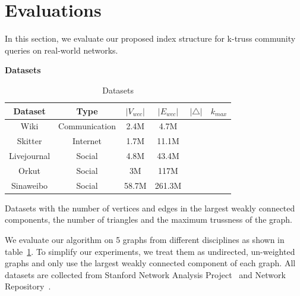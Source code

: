 \section{Evaluations}
\label{evaluation}

In this section, we evaluate our proposed index structure for k-truss community queries on real-world networks.

\vskip 0.1in \noindent \textbf{Datasets} 

\begin{table}
		\caption{Datasets}
		\vspace{2 mm}
		\label{table:datasets}
		\begin{threeparttable}
			\centering
			\begin{tabular}{c|ccccc} \hline
				Dataset & Type & $|V_{wcc}|$ & $|E_{wcc}|$ & $|\triangle|$ & $k_{max}$ \\ \hline
				Wiki & Communication & 2.4M & 4.7M &  & \\ 
				Skitter & Internet & 1.7M & 11.1M & & \\ 
				Livejournal & Social & 4.8M & 43.4M & & \\ 
				Orkut & Social & 3M & 117M & & \\ 
				Sinaweibo & Social & 58.7M & 261.3M & & \\ \hline
			\end{tabular}
			\begin{tablenotes}
				\item Datasets with the number of vertices and edges in the largest weakly connected components, the number of triangles and the maximum trussness of the graph.
			\end{tablenotes}
		\end{threeparttable}
\end{table}

We evaluate our algorithm on 5 graphs from different disciplines as shown in table~\ref{table:datasets}. To simplify our experiments, we treat them as undirected, un-weighted graphs and only use the largest weakly connected component of each graph. All datasets are collected from Stanford Network Analysis Project~\cite{snapnets} and Network Repository~\cite{nr-aaai15}.

